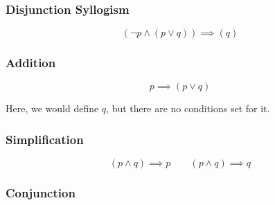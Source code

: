 \subsubsection{Disjunction Syllogism}\label{ssub:disjunction_syllogism}

\begin{minipage}{0.45\linewidth}
\end{minipage}
\hfill
\begin{minipage}{0.45\linewidth}
    \[
        \left( \neg p \land (p \lor q) \right) \implies (q)
    \]
\end{minipage}

\subsubsection{Addition}\label{ssub:proplogic_addition}

\begin{minipage}{0.45\linewidth}
\end{minipage}
\hfill
\begin{minipage}{0.45\linewidth}
    \[
        p \implies (p \lor q)
    \]
\end{minipage}

\begin{note}
    Here, we would define \(q\), but there are no conditions set for it.
\end{note}

\subsubsection{Simplification}\label{ssub:proplogic_simplification}

\begin{minipage}{0.45\linewidth}
\end{minipage}
\hfill
\begin{minipage}{0.45\linewidth}
    \[
        (p \land q) \implies p \qquad (p \land q) \implies q
    \]
\end{minipage}

\subsubsection{Conjunction}\label{ssub:proplogic_conjunction}

